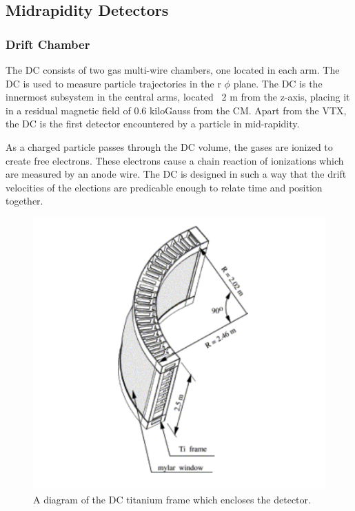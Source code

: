 \subsection{Midrapidity Detectors}
\subsubsection{Drift Chamber}
The DC consists of two gas multi-wire chambers, one located in each arm. The DC is used to measure particle trajectories in the r $\phi$ plane.
The DC is the innermost subsystem in the central arms, located ~2 m from the z-axis, placing it in a residual magnetic field of 0.6 kiloGauss from the CM. Apart from the VTX, the DC is the first detector encountered by a particle in mid-rapidity. 

As a charged particle passes through the DC volume, the gases are ionized to create free electrons. These electrons cause a chain reaction of ionizations which are measured by an anode wire. The DC is designed in such a way that the drift velocities of the elections are predicable enough to relate time and position together. 

\begin{figure}[!h]
\begin{center}
\includegraphics[width=0.55\linewidth]{figs/dc_diagram.png}
\caption{A diagram of the DC titanium frame which encloses the detector.}\label{fig:dc_diagram}
\end{center}
\end{figure}

